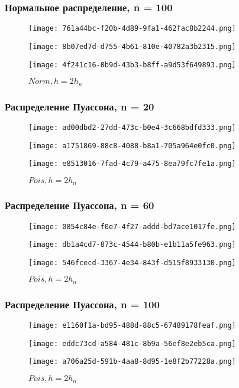 \subsubsection{Нормальное распределение, n = 100}
\begin{figure}[!htb]
  \texttt{[image: 761a44bc-f20b-4d89-9fa1-462fac8b2244.png]}
  \caption{\(Norm, h=h_n/2\)}
\endminipage\hfill
{}
  \texttt{[image: 8b07ed7d-d755-4b61-810e-40782a3b2315.png]}
  \caption{\(Norm, h=h_n\)}
\endminipage\hfill
{}
  \texttt{[image: 4f241c16-0b9d-43b3-b8ff-a9d53f649893.png]}
  \caption{\(Norm, h=2h_n\)}
\endminipage
 \label{fig:norm100}
\end{figure}
\newpage
\subsubsection{Распределение Пуассона, n = 20}
\begin{figure}[!htb]
  \texttt{[image: ad00dbd2-27dd-473c-b0e4-3c668bdfd333.png]}
  \caption{\(Pois, h=h_n/2\)}
\endminipage\hfill
{}
  \texttt{[image: a1751869-88c8-4088-b8a1-705a964e0fc0.png]}
  \caption{\(Pois, h=h_n\)}
\endminipage\hfill
{}
  \texttt{[image: e8513016-7fad-4c79-a475-8ea79fc7fe1a.png]}
  \caption{\(Pois, h=2h_n\)}
\endminipage
 \label{fig:pois20}
\end{figure}
\subsubsection{Распределение Пуассона, n = 60}
\begin{figure}[!htb]
  \texttt{[image: 0854c84e-f0e7-4f27-addd-bd7ace1017fe.png]}
  \caption{\(Pois, h=h_n/2\)}
\endminipage\hfill
{}
  \texttt{[image: db1a4cd7-873c-4544-b80b-e1b11a5fe963.png]}
  \caption{\(Pois, h=h_n\)}
\endminipage\hfill
{}
  \texttt{[image: 546fcecd-3367-4e34-843f-d515f8933130.png]}
  \caption{\(Pois, h=2h_n\)}
\endminipage
 \label{fig:pois60}
\end{figure}
\subsubsection{Распределение Пуассона, n = 100}
\begin{figure}[!htb]
  \texttt{[image: e1160f1a-bd95-488d-88c5-67489178feaf.png]}
  \caption{\(Pois, h=h_n/2\)}
\endminipage\hfill
{}
  \texttt{[image: eddc73cd-a584-481c-8b9a-56ef8e2eb5ca.png]}
  \caption{\(Pois, h=h_n\)}
\endminipage\hfill
{}
  \texttt{[image: a706a25d-591b-4aa8-8d95-1e8f2b77228a.png]}
  \caption{\(Pois, h=2h_n\)}
\endminipage
\label{fig:pois100}
\end{figure}
\newpage
